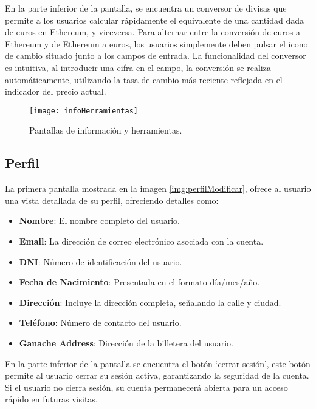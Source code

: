 En la parte inferior de la pantalla, se encuentra un conversor de divisas que permite a los usuarios calcular rápidamente el equivalente de una cantidad dada de euros en Ethereum, y viceversa. Para alternar entre la conversión de euros a Ethereum y de Ethereum a euros, los usuarios simplemente deben pulsar el icono de cambio situado junto a los campos de entrada.
La funcionalidad del conversor es intuitiva, al introducir una cifra en el campo, la conversión se realiza automáticamente, utilizando la tasa de cambio más reciente reflejada en el indicador del precio actual. 

\begin{figure}[h]
	\label{img:infoHerramientas}
	\centering
	\texttt{[image: infoHerramientas]}
	\caption[Pantalla utilidades]{Pantallas de información y herramientas.}
\end{figure}


\subsection{Perfil}

La primera pantalla mostrada en la imagen \ref{img:perfilModificar}, ofrece al usuario una vista detallada de su perfil, ofreciendo detalles como:

\begin{itemize}
\item \textbf{Nombre}: El nombre completo del usuario.

\item \textbf{Email}: La dirección de correo electrónico asociada con la cuenta.

\item \textbf{DNI}: Número de identificación del usuario.

\item \textbf{Fecha de Nacimiento}: Presentada en el formato día/mes/año.

\item \textbf{Dirección}: Incluye la dirección completa, señalando la calle y ciudad.

\item \textbf{Teléfono}: Número de contacto del usuario.

\item \textbf{Ganache Address}: Dirección de la billetera del usuario.
\end{itemize}

En la parte inferior de la pantalla se encuentra el botón `cerrar sesión', este botón permite al usuario cerrar su sesión activa, garantizando la seguridad de la cuenta. Si el usuario no cierra sesión, su cuenta permanecerá abierta para un acceso rápido en futuras visitas.

